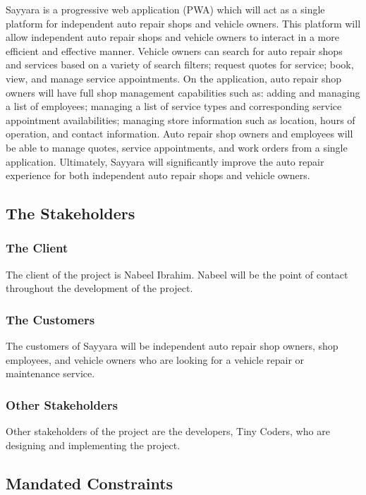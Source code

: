 \documentclass[12pt]{article}
\begin{document}
Sayyara is a progressive web application (PWA) which will act as a single platform for independent
auto repair shops and vehicle owners. This platform will allow independent auto repair shops and
vehicle owners to interact in a more efficient and effective manner. Vehicle owners can search for
auto repair shops and services based on a variety of search filters; request quotes for service;
book, view, and manage service appointments. On the application, auto repair shop owners will have
full shop management capabilities such as: adding and managing a list of employees; managing a list
of service types and corresponding service appointment availabilities; managing store information
such as location, hours of operation, and contact information. Auto repair shop owners and
employees will be able to manage quotes, service appointments, and work orders from a single
application. Ultimately, Sayyara will significantly improve the auto repair experience for both
independent auto repair shops and vehicle owners.

\subsection{The Stakeholders}

\subsubsection{The Client}
The client of the project is Nabeel Ibrahim. Nabeel will be the point of contact throughout the
development of the project.

\subsubsection{The Customers}
The customers of Sayyara will be independent auto repair shop owners, shop employees, and vehicle
owners who are looking for a vehicle repair or maintenance service.

\subsubsection{Other Stakeholders}
Other stakeholders of the project are the developers, Tiny Coders, who are designing and
implementing the project.

\subsection{Mandated Constraints}
\end{document}
